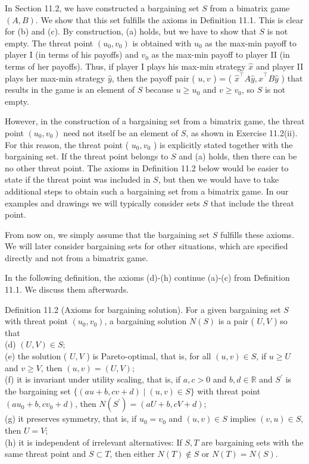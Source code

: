 \documentclass[12pt]{article}
\begin{document}
In Section 11.2, we have constructed a bargaining set $S$ from a bimatrix game $(A, B)$. We show that this set fulfills the axioms in Definition 11.1. This is clear for (b) and (c). By construction, (a) holds, but we have to show that $S$ is not empty. The threat point $\left(u_{0}, v_{0}\right)$ is obtained with $u_{0}$ as the max-min payoff to player I (in terms of his payoffs) and $v_{0}$ as the max-min payoff to player II (in terms of her payoffs). Thus, if player I plays his max-min strategy $\hat{x}$ and player II plays her max-min strategy $\hat{y}$, then the payoff pair ( $u, v$ ) = ( $\hat{x}^{\top} A \hat{y}, \hat{x}^{\top} B \hat{y}$ ) that results in the game is an element of $S$ because $u \geq u_{0}$ and $v \geq v_{0}$, so $S$ is not empty.

However, in the construction of a bargaining set from a bimatrix game, the threat point $\left(u_{0}, v_{0}\right)$ need not itself be an element of $S$, as shown in Exercise 11.2(ii). For this reason, the threat point ( $u_{0}, v_{0}$ ) is explicitly stated together with the bargaining set. If the threat point belongs to $S$ and (a) holds, then there can be no other threat point. The axioms in Definition 11.2 below would be easier to state if the threat point was included in $S$, but then we would have to take additional steps to obtain such a bargaining set from a bimatrix game. In our examples and drawings we will typically consider sets $S$ that include the threat point.

From now on, we simply assume that the bargaining set $S$ fulfills these axioms. We will later consider bargaining sets for other situations, which are specified directly and not from a bimatrix game.

In the following definition, the axioms (d)-(h) continue (a)-(c) from Definition 11.1. We discuss them afterwards.

Definition 11.2 (Axioms for bargaining solution). For a given bargaining set $S$ with threat point $\left(u_{0}, v_{0}\right)$, a bargaining solution $N(S)$ is a pair ( $U, V$ ) so that\\
(d) $(U, V) \in S$;\\
(e) the solution ( $U, V$ ) is Pareto-optimal, that is, for all $(u, v) \in S$, if $u \geq U$ and $v \geq V$, then $(u, v)=(U, V) ;$\\
(f) it is invariant under utility scaling, that is, if $a, c>0$ and $b, d \in \mathbb{R}$ and $S^{\prime}$ is the bargaining set $\{(a u+b, c v+d) \mid(u, v) \in S\}$ with threat point $\left(a u_{0}+b, c v_{0}+d\right)$, then $N\left(S^{\prime}\right)=(a U+b, c V+d)$;\\
(g) it preserves symmetry, that is, if $u_{0}=v_{0}$ and $(u, v) \in S$ implies $(v, u) \in S$, then $U=V ;$\\
(h) it is independent of irrelevant alternatives: If $S, T$ are bargaining sets with the same threat point and $S \subset T$, then either $N(T) \notin S$ or $N(T)=N(S)$.
\end{document}
